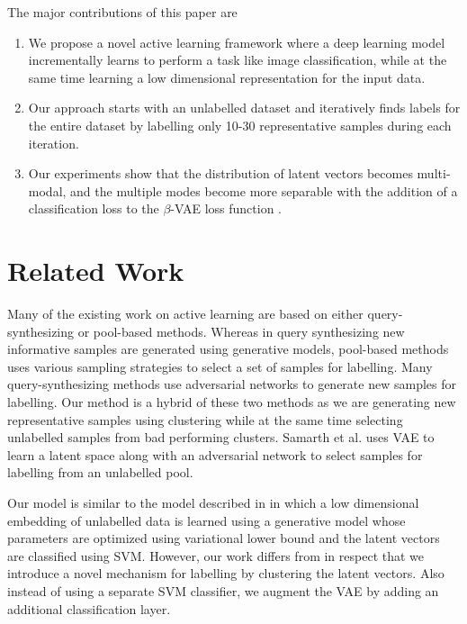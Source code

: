 \documentclass[runningheads]{llncs}
\begin{document}
The major contributions of this paper are
\begin{enumerate}
    \item We propose a novel active learning framework where a  deep learning model incrementally learns to perform a task like image classification, while at the same time learning a low dimensional representation for the input data.
    \item Our approach starts with an unlabelled dataset and iteratively finds labels for the entire dataset by labelling only 10-30 representative samples during each iteration.
    \item Our experiments show that the distribution of latent vectors becomes multi-modal, and the multiple modes become more separable with the addition of a classification loss to the $\beta$-VAE loss function \cite{beta_vae}.
\end{enumerate}

\section{Related Work}
Many of the existing work on active learning are based on either query-synthesizing or  pool-based methods.
Whereas in query synthesizing new informative samples are generated using generative models, pool-based methods \cite{wang_2016,beluch_2018} uses various sampling strategies to select a set of samples for labelling.
Many query-synthesizing methods use adversarial networks \cite{mahapatra_2018,mayer_2020} to generate new samples for labelling.
Our method is a hybrid of these two methods as we are generating new representative samples using clustering while at the same time selecting unlabelled samples from bad performing clusters.
Samarth et al. \cite{vaal} uses VAE to learn a latent space along with an adversarial network to select samples for labelling from an unlabelled pool.

Our model is similar to the model described in \cite{kingma_2014} in which a low dimensional embedding of unlabelled data is learned using a generative model whose parameters are optimized using variational lower bound and the latent vectors are classified using SVM.
However, our work differs from \cite{kingma_2014} in respect that we introduce a novel mechanism for labelling by clustering the latent vectors.
Also instead of using a separate SVM classifier, we augment the VAE by adding an additional classification layer.
\end{document}
